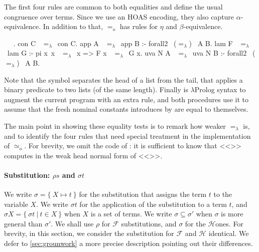 \documentclass[sigconf,natbib=false,review]{acmart}
\newcommand{\EqualRel}{\ensuremath{=}}
\newcommand{\UnifRel}{\ensuremath{\simeq}}
\newcommand{\Uo}{\texorpdfstring{\ensuremath{\UnifRel_o}\xspace}{unif\_o}}
\newcommand{\Eo}{\ensuremath{\EqualRel_o}\xspace}
\newcommand{\Ee}{\ensuremath{\EqualRel_\lambda}\xspace}
\newcommand{\Fo}{\texorpdfstring{\ensuremath{\mathcal{F}\xspace}}{F}} %
\newcommand{\Ho}{\texorpdfstring{\ensuremath{\mathcal{H}}\xspace}{H}}
\begin{document}
The first four rules are common to both equalities
and define the usual congruence over terms. Since
we use an HOAS encoding, they also capture $\alpha$-equivalence.
In addition to that, \Eo has rules for $\eta$ and $\beta$-equivalence.



\begin{elpicode}
  ~ \PYG{n+nf}{(\Ee)} ~.
  con C ~\Ee~con C.
  app A ~\Ee~app B :- forall2 ~(\Ee)~ A B.
  lam F ~\Ee~lam G :- pi x\ x ~\Ee~x => F x ~\Ee~G x.
  uva N A ~\Ee~uva N B :- forall2 ~(\Ee)~ A B.
\end{elpicode}

\noindent
Note that the symbol \elpiIn{|} separates the head of a list from the tail,
that  applies a binary predicate to two lists (of the same
length). Finally \elpiIn{=>} is $\lambda$Prolog syntax to augment the
current program with an extra rule, and both procedures use it to
assume that the fresh nominal constants introduces by  are
equal to themselves.

The main point in showing these equality tests is to remark how
weaker \Ee is, and to identify the four rules that need special
treatment in the implementation of \Uo.
For brevity, we omit the code of :
it is sufficient to know that <<>> computes in  the
weak head normal form of <<>>.

\paragraph{Substitution: $\rho s$ and $\sigma t$}

We write $\sigma = \{~ X \mapsto t ~\}$ for the substitution that assigns
the term $t$ to the variable $X$.
We write $\sigma t$ for the application of
the substitution to a term $t$, and $\sigma X = \{~ \sigma t ~|~ t \in X ~\}$ when
$X$ is a set of terms.
We write $\sigma \subseteq \sigma'$ when $\sigma$ is more
general than $\sigma'$.
We shall use $\rho$ for \Fo{} substitutions,
and $\sigma$ for the \Ho ones.
For brevity, in this section, we consider
the substitution for \Fo{} and \Ho{} identical.
We defer to \cref{sec:grounwork} a more precise description
pointing out their differences.
\end{document}
